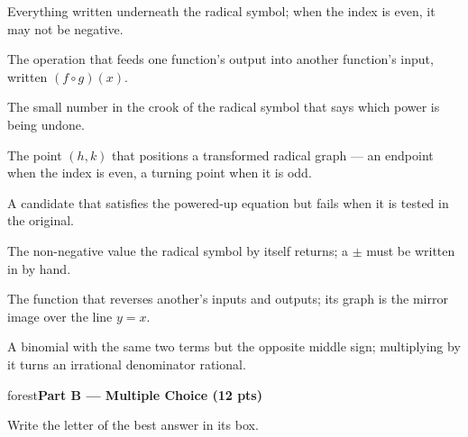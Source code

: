 \documentclass[10pt]{article}
\newcommand{\parthead}[1]{%
  \vspace{6pt}\noindent
  \begin{headlinebox}{forest}\color{white}\bfseries #1\end{headlinebox}%
  \vspace{4pt}}
\begin{document}
\begin{minipage}[t]{0.61\textwidth}
\small
\begin{description}[leftmargin=1.4em, itemsep=3pt]
  \item[(A)] Everything written underneath the radical symbol; when the index is even, it may not be negative.
  \item[(B)] The operation that feeds one function's output into another function's input, written $(f\circ g)(x)$.
  \item[(C)] The small number in the crook of the radical symbol that says which power is being undone.
  \item[(D)] The point $(h,k)$ that positions a transformed radical graph --- an endpoint when the index is even, a turning point when it is odd.
  \item[(E)] A candidate that satisfies the powered-up equation but fails when it is tested in the original.
  \item[(F)] The non-negative value the radical symbol by itself returns; a $\pm$ must be written in by hand.
  \item[(G)] The function that reverses another's inputs and outputs; its graph is the mirror image over the line $y=x$.
  \item[(H)] A binomial with the same two terms but the opposite middle sign; multiplying by it turns an irrational denominator rational.
\end{description}
\end{minipage}

\parthead{Part B --- Multiple Choice (12 pts)}
Write the letter of the best answer in its box.
\end{document}
